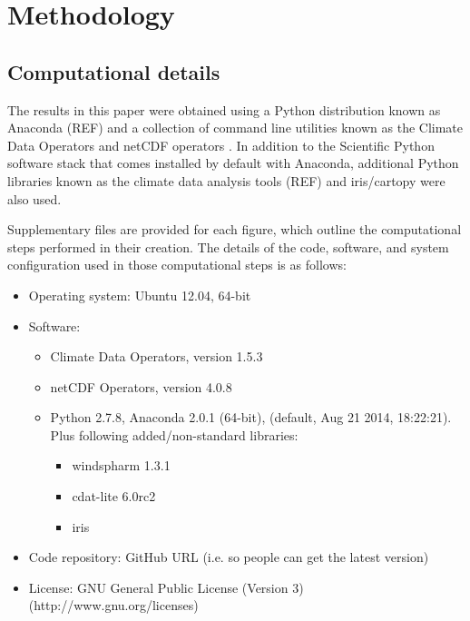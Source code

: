 \section{Methodology}\label{s:methodology}

\subsection{Computational details}\label{s:computational_details}

The results in this paper were obtained using a Python distribution known as Anaconda (REF) and a collection of command line utilities known as the Climate Data Operators \citep[CDO;][]{Schulzweida2014} and netCDF operators \citep[NCO;][]{Zender2014}. In addition to the Scientific Python \citep[SciPy;][]{SciPy} software stack that comes installed by default with Anaconda, additional Python libraries known as the climate data analysis tools (REF) and iris/cartopy \citep{Iris} were also used. 


Supplementary files are provided for each figure, which outline the computational steps performed in their creation. The details of the code, software, and system configuration used in those computational steps is as follows:   
\begin{itemize}
\item Operating system: Ubuntu 12.04, 64-bit %
\item Software: 
\begin{itemize}
\item Climate Data Operators, version 1.5.3 \citep{Schulzweida2014} %
\item netCDF Operators, version 4.0.8 \citep{Zender2014} %
\item Python 2.7.8, Anaconda 2.0.1 (64-bit), (default, Aug 21 2014, 18:22:21). Plus following added/non-standard libraries:  %
\begin{itemize}
\item windspharm 1.3.1 %
\item cdat-lite 6.0rc2 %
\item iris \citep{Iris}
\end{itemize}
\end{itemize}
\item Code repository: GitHub URL (i.e. so people can get the latest version)
\item License: GNU General Public License (Version 3) (http://www.gnu.org/licenses) %
\end{itemize}



